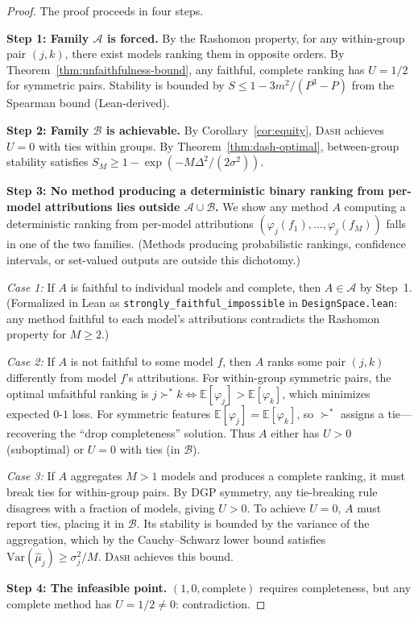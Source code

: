 \documentclass{article}
\newcommand{\E}{\mathbb{E}}
\newcommand{\Var}{\mathrm{Var}}
\newcommand{\DASH}{\textsc{Dash}}
\begin{document}
\begin{proof}
The proof proceeds in four steps.

\textbf{Step 1: Family $\mathcal{A}$ is forced.}
By the Rashomon property, for any within-group pair $(j,k)$, there exist models ranking them in opposite orders. By Theorem~\ref{thm:unfaithfulness-bound}, any faithful, complete ranking has $U = 1/2$ for symmetric pairs. Stability is bounded by $S \leq 1 - 3m^2/(P^3{-}P)$ from the Spearman bound (Lean-derived).\label{thm:impossibility-tight}

\textbf{Step 2: Family $\mathcal{B}$ is achievable.}
By Corollary~\ref{cor:equity}, \DASH{} achieves $U = 0$ with ties within groups. By Theorem~\ref{thm:dash-optimal}, between-group stability satisfies $S_M \geq 1 - \exp(-M\Delta^2/(2\sigma^2))$.

\textbf{Step 3: No method producing a deterministic binary ranking from per-model attributions lies outside $\mathcal{A} \cup \mathcal{B}$.}
We show any method $A$ computing a deterministic ranking from per-model attributions $(\varphi_j(f_1), \ldots, \varphi_j(f_M))$ falls in one of the two families. (Methods producing probabilistic rankings, confidence intervals, or set-valued outputs are outside this dichotomy.)

\emph{Case 1:} If $A$ is faithful to individual models and complete, then $A \in \mathcal{A}$ by Step~1. (Formalized in Lean as \texttt{strongly\_faithful\_impossible} in \texttt{DesignSpace.lean}: any method faithful to each model's attributions contradicts the Rashomon property for $M \geq 2$.)

\emph{Case 2:} If $A$ is not faithful to some model $f$, then $A$ ranks some pair $(j,k)$ differently from model $f$'s attributions. For within-group symmetric pairs, the optimal unfaithful ranking is $j \succ^* k \Leftrightarrow \E[\varphi_j] > \E[\varphi_k]$, which minimizes expected $0$-$1$ loss. For symmetric features $\E[\varphi_j] = \E[\varphi_k]$, so $\succ^*$ assigns a tie---recovering the ``drop completeness'' solution. Thus $A$ either has $U > 0$ (suboptimal) or $U = 0$ with ties (in $\mathcal{B}$).

\emph{Case 3:} If $A$ aggregates $M > 1$ models and produces a complete ranking, it must break ties for within-group pairs. By DGP symmetry, any tie-breaking rule disagrees with a fraction of models, giving $U > 0$. To achieve $U = 0$, $A$ must report ties, placing it in $\mathcal{B}$. Its stability is bounded by the variance of the aggregation, which by the Cauchy--Schwarz lower bound satisfies $\Var(\hat\mu_j) \geq \sigma_j^2/M$. \DASH{} achieves this bound.

\textbf{Step 4: The infeasible point.}
$(1, 0, \text{complete})$ requires completeness, but any complete method has $U = 1/2 \neq 0$: contradiction.
\end{proof}
\end{document}
